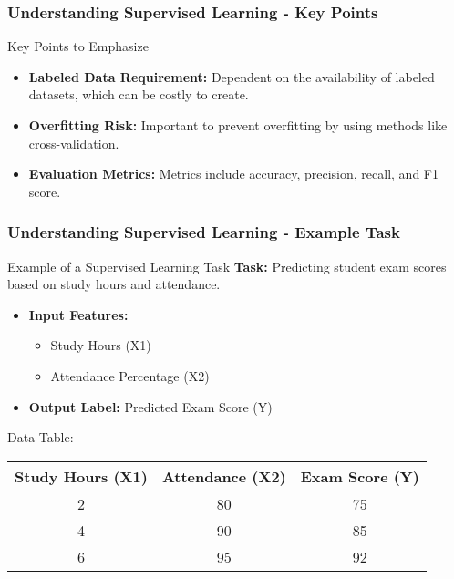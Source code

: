 \documentclass[aspectratio=169]{beamer}
\begin{document}
\begin{frame}[fragile]
    \frametitle{Understanding Supervised Learning - Key Points}
    \begin{block}{Key Points to Emphasize}
        \begin{itemize}
            \item \textbf{Labeled Data Requirement:} Dependent on the availability of labeled datasets, which can be costly to create.
            \item \textbf{Overfitting Risk:} Important to prevent overfitting by using methods like cross-validation.
            \item \textbf{Evaluation Metrics:} Metrics include accuracy, precision, recall, and F1 score.
        \end{itemize}
    \end{block}
\end{frame}

\begin{frame}[fragile]
    \frametitle{Understanding Supervised Learning - Example Task}
    \begin{block}{Example of a Supervised Learning Task}
        \textbf{Task:} Predicting student exam scores based on study hours and attendance.
    \end{block}

    \begin{itemize}
        \item \textbf{Input Features:}
            \begin{itemize}
                \item Study Hours (X1)
                \item Attendance Percentage (X2)
            \end{itemize}
        \item \textbf{Output Label:} Predicted Exam Score (Y)
    \end{itemize}

    \begin{block}{Data Table:}
        \begin{tabular}{|c|c|c|}
            \hline
            \textbf{Study Hours (X1)} & \textbf{Attendance (X2)} & \textbf{Exam Score (Y)} \\
            \hline
            2 & 80 & 75 \\
            4 & 90 & 85 \\
            6 & 95 & 92 \\
            \hline
        \end{tabular}
    \end{block}
\end{frame}
\end{document}
